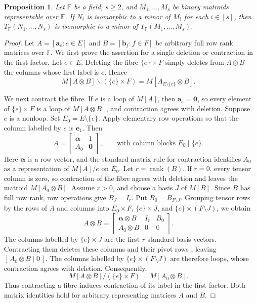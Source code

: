 \documentclass[12pt,a4paper]{article}
\numberwithin{equation}{section}
\DeclareMathOperator{\rank}{rank}
\newcommand{\F}{\mathbb F}
\newtheorem{proposition}[proposition]{Proposition}
\theoremstyle{definition}
\theoremstyle{remark}
\begin{document}
\begin{proposition}\label{thm:factor-minors}
Let \(\F\) be a field, \(s\ge2\), and \(M_1,\ldots,M_s\) be binary
matroids representable over \(\F\).  If \(N_i\) is
isomorphic to a minor of \(M_i\) for each \(i\in[s]\), then
\(T_{\F}(N_1,\ldots,N_s)\) is isomorphic to a minor of
\(T_{\F}(M_1,\ldots,M_s)\).
\end{proposition}
\begin{proof}
Let \(A=[\boldsymbol a_e:e\in E]\) and
\(B=[\boldsymbol b_f:f\in F]\) be arbitrary full row rank matrices
over \(\F\).  We first prove
the assertion for a single deletion or contraction in the first factor.  Let \(e\in E\).  Deleting the fibre \(\{e\}\times F\) simply deletes from
\(A\otimes B\) the columns whose first label is \(e\).  Hence
\[
M[A\otimes B]\backslash(\{e\}\times F)=M[A_{E\setminus\{e\}}\otimes B].
\]

We next contract the fibre.  If \(e\) is a loop of \(M[A]\), then
\(\boldsymbol{a}_e=\boldsymbol{0}\), so every element of \(\{e\}\times F\)
is a loop of \(M[A\otimes B]\), and contraction agrees with deletion.
Suppose  \(e\) is a nonloop.  Set \(E_0=E\setminus\{e\}\).  Apply
elementary row operations so that the column labelled by \(e\) is
\(\boldsymbol{e}_1\).  Then
\[
A=
 \left[
 \begin{array}{c|c}
   \boldsymbol{\alpha}&1\\ \hline
   A_0&\boldsymbol{0}
 \end{array}
 \right],
 \qquad
 \text{with column blocks }E_0\mid\{e\}.
\]
Here \(\boldsymbol{\alpha}\) is a row vector, and the standard matrix rule for
contraction \cite[Proposition~3.2.6]{oxley} identifies \(A_0\) as a
representation of \(M[A]/e\) on \(E_0\).  Let \(r=\rank(B)\).
If \(r=0\), every tensor column is zero, so contraction of the fibre
agrees with deletion and leaves the matroid \(M[A_0\otimes B]\).
Assume \(r>0\), and choose a basis \(J\) of \(M[B]\).
Since \(B\) has full row rank, row operations give \(B_J=I_r\).
Put \(B_0=B_{F\setminus J}\).  Grouping tensor rows by the rows of
\(A\) and columns into \(E_0\times F\), \(\{e\}\times J\), and
\(\{e\}\times(F\setminus J)\), we obtain
\[
A\otimes B=
 \left[
 \begin{array}{c|c|c}
   \boldsymbol{\alpha}\otimes B&I_r&B_0\\ \hline
   A_0\otimes B&0&0
 \end{array}
 \right].
\]
The columns labelled by \(\{e\}\times J\) are the first \(r\) standard
basis vectors.  Contracting them deletes these columns and their
pivot rows \cite[Proposition~3.2.6]{oxley}, leaving \([\,A_0\otimes B\mid 0\,]\).
The columns labelled by \(\{e\}\times(F\setminus J)\) are therefore
loops, whose contraction agrees with deletion.  Consequently,
\[
M[A\otimes B]/(\{e\}\times F)=M[A_0\otimes B].
\]
Thus contracting a fibre induces contraction of its label in the
first factor.  Both matrix identities hold for arbitrary representing
matrices \(A\) and \(B\).


\end{proof}
\end{document}
